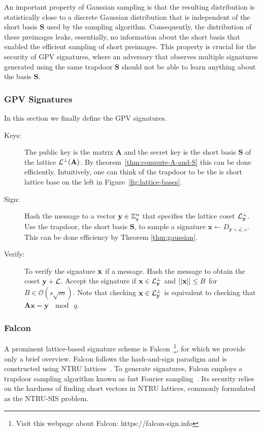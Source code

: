 An important property of Gaussian sampling is that the resulting distribution is statistically close to a discrete Gaussian distribution that is independent of the short basis \(\mathbf{S}\) used by the sampling algorithm. Consequently, the distribution of these preimages leaks, essentially, no information about the short basis that enabled the efficient sampling of short preimages.
This property is crucial for the security of GPV signatures, where an adversary that observes multiple signatures generated using the same trapdoor \(\mathbf{S}\) should not be able to learn anything about the basis \(\mathbf{S}\).

\subsubsection{GPV Signatures}
In this section we finally define the GPV signatures.
\begin{description}
    \item[Keys:] The public key is the matrix \(\mathbf{A}\) and the secret key is the short basis \(\mathbf{S}\) of the lattice \(\mathcal{L}^\bot(\mathbf{A})\). By theorem~\ref{thm:compute-A-and-S} this can be done efficiently. Intuitively, one can think of the trapdoor to be the is short lattice base on the left in Figure~\ref{fig:lattice-bases}.
    \item[Sign:] Hash the message to a vector \(\mathbf{y}\in\mathbb{Z}_q^n\) that specifies the lattice coset \(\mathcal{L}_{\mathbf{y}}^\bot\). Use the trapdoor, \ie the short basis \(\mathbf{S}\), to sample a signature \(\mathbf{x} \gets D_{\mathbf{y}+\mathcal{L},s}\). This can be done efficiency by Theorem \ref{thm:gaussian}.
    \item[Verify:] To verify the signature \(\mathbf{x}\) if a message. Hash the message to obtain the coset \(\mathbf{y}+\mathcal{L}\). Accept the signature if \(\mathbf{x}\in\mathcal{L}^{\bot}_\mathbf{y}\) and \(||\mathbf{x}||\leq B\) for \(B\in\mathcal{O}(s\sqrt{m})\). Note that checking \(\mathbf{x}\in\mathcal{L}^{\bot}_\mathbf{y}\) is equivalent to checking that \(\mathbf{Ax} = \mathbf{y} \: \mod \: q\).
\end{description}

\subsubsection{Falcon}
A prominent lattice-based signature scheme is Falcon~\cite{Falcon}\footnote{Visit this webpage about Falcon: https://falcon-sign.info}, for which we provide only a brief overview. Falcon follows the hash-and-sign paradigm and is constructed using NTRU lattices~\cite{HPS98}. To generate signatures, Falcon employs a trapdoor sampling algorithm known as fast Fourier sampling~\cite{EPRINT:DucPre15b}. Its security relies on the hardness of finding short vectors in NTRU lattices, commonly formulated as the NTRU-SIS problem.

